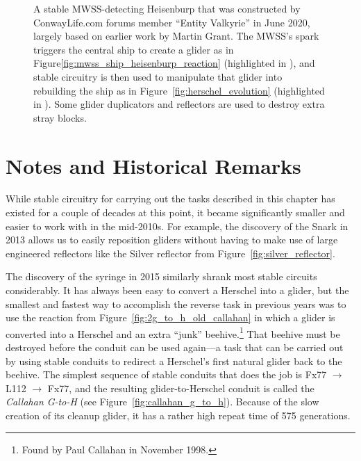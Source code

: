 \begin{figure}[!htb]
	\centering
	\caption{A stable MWSS-detecting Heisenburp that was constructed by ConwayLife.com forums member ``Entity Valkyrie'' in June 2020, largely based on earlier work by Martin Grant. The MWSS's spark triggers the central ship to create a glider as in Figure\ref{fig:mwss_ship_heisenburp_reaction} (highlighted in ), and stable circuitry is then used to manipulate that glider into rebuilding the ship as in Figure~\ref{fig:herschel_evolution} (highlighted in ). Some glider duplicators and reflectors are used to destroy extra stray blocks.}\label{fig:stable_heisenburp}
\end{figure}


\section{Notes and Historical Remarks}\label{sec:stable_circuits_notes}

While stable circuitry for carrying out the tasks described in this chapter has existed for a couple of decades at this point, it became significantly smaller and easier to work with in the mid-2010s. For example, the discovery of the Snark in 2013 allows us to easily reposition gliders without having to make use of large engineered reflectors like the Silver reflector from Figure~\ref{fig:silver_reflector}.

The discovery of the syringe in 2015 similarly shrank most stable circuits considerably. It has always been easy to convert a Herschel into a glider, but the smallest and fastest way to accomplish the reverse task in previous years was to use the reaction from Figure~\ref{fig:2g_to_h_old_callahan} in which a glider is converted into a Herschel and an extra ``junk'' beehive.\footnote{Found by Paul Callahan in November 1998.} That beehive must be destroyed before the conduit can be used again---a task that can be carried out by using stable conduits to redirect a Herschel's first natural glider back to the beehive. The simplest sequence of stable conduits that does the job is Fx77 $\rightarrow$ L112 $\rightarrow$ Fx77, and the resulting glider-to-Herschel conduit is called the \emph{Callahan G-to-H} (see Figure~\ref{fig:callahan_g_to_h}). Because of the slow creation of its cleanup glider, it has a rather high repeat time of 575 generations.

